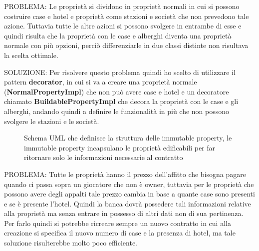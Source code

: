 PROBLEMA:
Le proprietà si dividono in proprietà normali in cui si possono costruire case e hotel e proprietà come stazioni e società che non prevedono tale azione. 
Tuttavia tutte le altre azioni si possono svolgere in entrambe di esse e quindi risulta che la proprietà con le case e alberghi diventa una proprietà normale con più opzioni, 
perciò differenziarle in due classi distinte non risultava la scelta ottimale.\newline

SOLUZIONE:
Per risolvere questo problema quindi ho scelto di utilizzare il pattern \textbf{decorator}, in cui si va a creare una proprietà normale (\textbf{NormalPropertyImpl}) 
che non può avere case e hotel e un decoratore chiamato \textbf{BuildablePropertyImpl} che decora la proprietà con le case e gli alberghi,
andando quindi a definire le funzionalità in più che non possono svolgere le stazioni e le società.\newline

\begin{figure}[H]
    \centering
    \caption{Schema UML che definisce la struttura delle immutable property, 
    le immutable property incapsulano le proprietà edificabili per far ritornare solo le informazioni necessarie al contratto}
	\label{img:Proxy}
\end{figure}
PROBLEMA:
Tutte le proprietà hanno il prezzo dell'affitto che bisogna pagare quando ci passa sopra un giocatore che non è owner, 
tuttavia per le proprietà che possono avere degli appalti tale prezzo cambia in base a quante case sono presenti e se è presente l'hotel.
Quindi la banca dovrà possedere tali informazioni relative alla proprietà ma senza entrare in possesso di altri dati non di sua pertinenza.
Per farlo quindi si potrebbe ricreare sempre un nuovo contratto in cui alla creazione si specifica il nuovo numero di case e la presenza di hotel, 
ma tale soluzione risulterebbe molto poco efficiente.\newline

